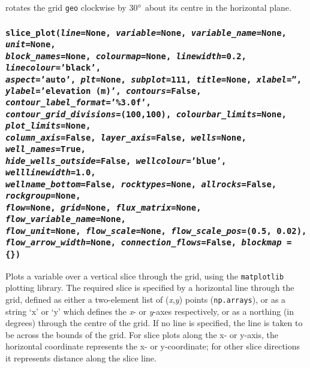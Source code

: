 rotates the grid \texttt{geo} clockwise by 30$\degree$ about its centre in the horizontal plane.

\begin{snugshade}
\subsubsection{\texttt{slice\_plot(\emph{line}=None, \emph{variable}=None, \emph{variable\_name}=None, \emph{unit}=None,\\
    \emph{block\_names}=None, \emph{colourmap}=None, \emph{linewidth}=0.2, \emph{linecolour}='black',\\
    \emph{aspect}='auto', \emph{plt}=None, \emph{subplot}=111, \emph{title}=None, \emph{xlabel}='',\\
    \emph{ylabel}='elevation (m)', \emph{contours}=False, \emph{contour\_label\_format}='\%3.0f',\\
    \emph{contour\_grid\_divisions}=(100,100), \emph{colourbar\_limits}=None, \emph{plot\_limits}=None,\\
    \emph{column\_axis}=False, \emph{layer\_axis}=False, \emph{wells}=None, \emph{well\_names}=True,\\
    \emph{hide\_wells\_outside}=False, \emph{wellcolour}='blue', \emph{welllinewidth}=1.0,\\
    \emph{wellname\_bottom}=False, \emph{rocktypes}=None, \emph{allrocks}=False, \emph{rockgroup}=None,\\
    \emph{flow}=None, \emph{grid}=None, \emph{flux\_matrix}=None, \emph{flow\_variable\_name}=None,\\
    \emph{flow\_unit}=None, \emph{flow\_scale}=None, \emph{flow\_scale\_pos}=(0.5, 0.02),\\
    \emph{flow\_arrow\_width}=None, \emph{connection\_flows}=False, \emph{blockmap} = \{\})}}
\end{snugshade}
\label{sec:mulgrid:slice_plot}

Plots a variable over a vertical slice through the grid, using the \texttt{matplotlib} plotting library.  The required slice is specified by a horizontal line through the grid, defined as either a two-element list of (\emph{x},\emph{y}) points (\texttt{np.arrays}), or as a string `x' or `y' which defines the \emph{x}- or \emph{y}-axes respectively, or as a northing (in degrees) through the centre of the grid.  If no line is specified, the line is taken to be across the bounds of the grid.  For slice plots along the x- or y-axis, the horizontal coordinate represents the x- or y-coordinate; for other slice directions it represents distance along the slice line.

